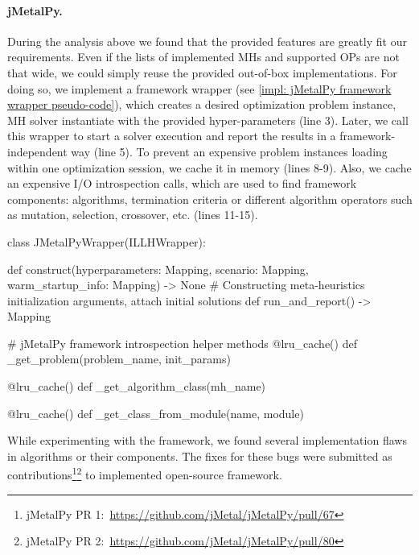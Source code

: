 \paragraph{jMetalPy.} During the analysis above we found that the provided features are greatly fit our requirements. Even if the lists of implemented MHs and supported OPs are not that wide, we could simply reuse the provided out-of-box implementations. For doing so, we implement a framework wrapper (see \cref{impl: jMetalPy framework wrapper pseudo-code}), which creates a desired optimization problem instance, MH solver instantiate with the provided hyper-parameters (line 3). Later, we call this wrapper to start a solver execution and report the results in a framework-independent way (line 5). To prevent an expensive problem instances loading within one optimization session, we cache it in memory (lines 8-9). Also, we cache an expensive I/O introspection calls, which are used to find framework components: algorithms, termination criteria or different algorithm operators such as mutation, selection, crossover, etc. (lines 11-15).

\begin{code}[language=Python, caption=jMetalPy framework wrapper pseudo-code., label=impl: jMetalPy framework wrapper pseudo-code]
class JMetalPyWrapper(ILLHWrapper):

	def construct(hyperparameters: Mapping, scenario: Mapping, warm_startup_info: Mapping) -> None
		# Constructing meta-heuristics initialization arguments, attach initial solutions
	def run_and_report() -> Mapping

	# jMetalPy framework introspection helper methods
	@lru_cache()
	def _get_problem(problem_name, init_params)
	
	@lru_cache()
	def _get_algorithm_class(mh_name)
	
	@lru_cache()
	def _get_class_from_module(name, module)
\end{code}

While experimenting with the framework, we found several implementation flaws in algorithms or their components. The fixes for these bugs were submitted as contributions\footnote{jMetalPy PR 1:~\url{https://github.com/jMetal/jMetalPy/pull/67}}\footnote{jMetalPy PR 2:~\url{https://github.com/jMetal/jMetalPy/pull/80}} to implemented open-source framework.

